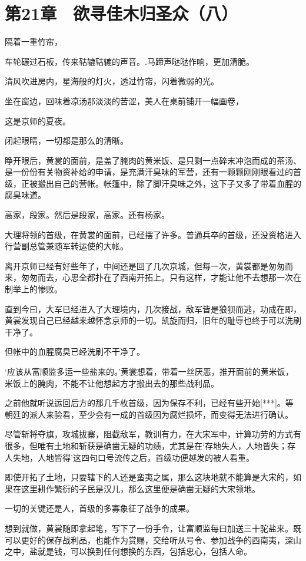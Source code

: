 \section{第21章　欲寻佳木归圣众（八）}

隔着一重竹帘，

车轮碾过石板，传来轱辘轱辘的声音。.马蹄声哒哒作响，更加清脆。

清风吹进房内，星海般的灯火，透过竹帘，闪着微弱的光。

坐在窗边，回味着凉汤那淡淡的苦涩，美人在桌前铺开一幅画卷，

这是京师的夏夜。

闭起眼睛，一切都是那么的清晰。

睁开眼后，黄裳的面前，是盖了腌肉的黄米饭、是只剩一点碎末冲泡而成的茶汤、是一份份有关物资补给的申请，是充满汗臭味的军营，还有一颗颗刚刚眼看过的首级，正被搬出自己的营帐。帐篷中，除了脚汗臭味之外，这下子又多了带着血腥的腐臭味道。

高家，段家。然后是段家，高家。还有杨家。

大理将领的首级，在黄裳的面前，已经摆了许多。普通兵卒的首级，还没资格进入行营副总管兼随军转运使的大帐。

离开京师已经有好些年了，中间还是回了几次京城，但每一次，黄裳都是匆匆而来，匆匆而去，心思全都扑在了西南开拓上。只有这样，才能让他不去想那一次在制举上的惨败。

直到今曰，大军已经进入了大理境内，几次接战，敌军皆是狼狈而逃，功成在即，黄裳发现自己已经越来越怀念京师的一切。凯旋而归，旧年的耻辱也终于可以洗刷干净了。

但帐中的血腥腐臭已经洗刷不干净了。

‘应该从富顺监多运一些盐来的。’黄裳想着，带着一丝厌恶，推开面前的黄米饭，米饭上的腌肉，不能不让他想起方才搬出去的那些战利品。

之前他就听说运回后方的那几千枚首级，因为保存不利，已经有些开始[***]。等朝廷的派人来验看，至少会有一成的首级因为腐烂损坏，而变得无法进行确认。

尽管斩将夺旗，攻城拔寨，阻截敌军，教训有力，在大宋军中，计算功劳的方式有很多，但唯有土地和斩获是确凿无疑的功绩，尤其是在‘存地失人，人地皆失；存人失地，人地皆得’这四句口号流传之后，首级功便越发的被人看重。

即使开拓了土地，只要辖下的人还是蛮夷之属，那么这块地就不能算是大宋的，如果在这里耕作繁衍的子民是汉儿，那么这里便是确凿无疑的大宋领地。

一切的关键还是人，首级的多寡象征了战争的成果。

想到就做，黄裳随即拿起笔，写下了一份手令，让富顺监每曰加送三十驼盐来。既可以更好的保存战利品，也能作为赏赐，交给听从号令、参加战争的西南夷，深山之中，盐就是钱，可以换到任何想换的东西，包括忠心，包括人命。

